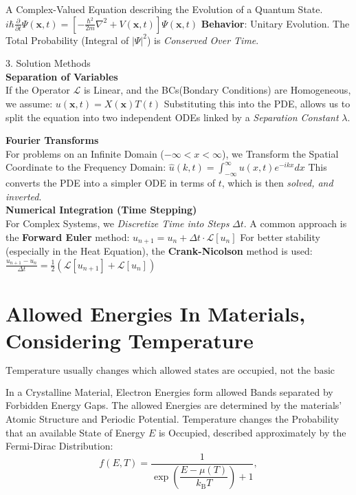 \documentclass[a4paper, 10pt, onepage]{elegantbook}
\begin{document}
A Complex-Valued Equation describing the Evolution of a Quantum State.
$i\hbar \frac{\partial}{\partial t} \Psi(\mathbf{x}, t) = \left[ -\frac{\hbar^2}{2m} \nabla^2 + V(\mathbf{x}, t) \right] \Psi(\mathbf{x}, t)$
   \textbf{Behavior}: Unitary Evolution. The Total Probability (Integral of $|\Psi|^2$) is \emph{Conserved Over Time}.

3. Solution Methods  \\

    \textbf{Separation of Variables}  \\

If the Operator $\mathcal{L}$ is Linear, and the BCs(Bondary Conditions) are Homogeneous, we assume:
$u(\mathbf{x}, t) = X(\mathbf{x})T(t) $
Substituting this into the PDE, allows us to split the equation into two independent ODEs linked by a \emph{Separation Constant} $\lambda$.

     \textbf{Fourier Transforms}  \\

For problems on an Infinite Domain ($-\infty < x < \infty$), we Transform the Spatial Coordinate to the Frequency Domain:
$ \hat{u}(k, t) = \int_{-\infty}^{\infty} u(x, t) e^{-ikx} dx $
This converts the PDE into a simpler ODE in terms of $t$, which is then \emph{solved, and inverted}.  \\

    \textbf{Numerical Integration (Time Stepping)}  \\

For Complex Systems, we \emph{Discretize Time into Steps} $\Delta t$. A common approach is the \textbf{Forward Euler} method:
$u_{n+1} = u_n + \Delta t \cdot \mathcal{L}[u_n]$
For better stability (especially in the Heat Equation), the \textbf{Crank-Nicolson} method is used:
$\frac{u_{n+1} - u_n}{\Delta t} = \frac{1}{2} \left( \mathcal{L}[u_{n+1}] + \mathcal{L}[u_n] \right) $


\chapter{Allowed Energies In Materials, Considering Temperature}

\[
\boxed{\text{Temperature usually changes which allowed states are occupied,
not the basic rule that determines which states are allowed.}}
\]

In a Crystalline Material, Electron Energies form allowed Bands separated by Forbidden Energy Gaps. The allowed Energies are determined by the materials' Atomic Structure and Periodic Potential. Temperature changes the Probability that an available State of Energy \(E\) is Occupied, described approximately by the Fermi-Dirac Distribution:
\[
f(E,T)=\frac{1}{\exp\!\left(\dfrac{E-\mu(T)}{k_{\mathrm B}T}\right)+1},
\]
\end{document}
